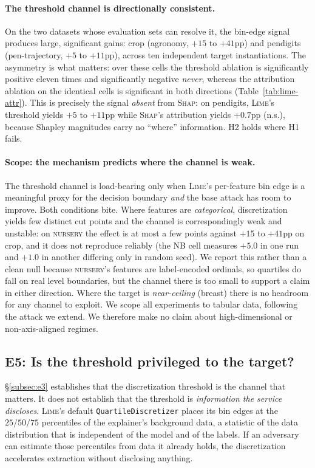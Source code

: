 \documentclass[sigconf,anonymous,review]{acmart}
\begin{document}
\paragraph{The threshold channel is directionally consistent.} On the two datasets whose evaluation
sets can resolve it, the bin-edge signal produces large, significant gains: crop (agronomy, $+15$ to
$+41$pp) and pendigits (pen-trajectory, $+5$ to $+11$pp), across ten independent target
instantiations. The asymmetry is what matters: over these cells the threshold ablation is
significantly positive eleven times and significantly negative \emph{never}, whereas the attribution
ablation on the identical cells is significant in both directions
(Table~\ref{tab:lime-attr}). This is precisely the signal \emph{absent} from \textsc{Shap}: on
pendigits, \textsc{Lime}'s threshold yields $+5$ to $+11$pp while \textsc{Shap}'s attribution yields
$+0.7$pp (n.s.), because Shapley magnitudes carry no ``where'' information. H2 holds where H1 fails.

\paragraph{Scope: the mechanism predicts where the channel is weak.} The threshold channel is
load-bearing only when \textsc{Lime}'s per-feature bin edge is a meaningful proxy for the decision
boundary \emph{and} the base attack has room to improve. Both conditions bite. Where features are
\emph{categorical}, discretization yields few distinct cut points and the channel is correspondingly
weak and unstable: on \textsc{nursery} the effect is at most a few points against $+15$ to $+41$pp on
crop, and it does not reproduce reliably (the NB cell measures $+5.0$ in one run and $+1.0$ in another differing only in random seed). We report this rather than a clean null because
\textsc{nursery}'s features are label-encoded ordinals, so quartiles do fall on real level boundaries, but the channel there is too small to support a claim in either direction. Where the target is \emph{near-ceiling} (breast) there is
no headroom for any channel to exploit. We scope all experiments to tabular data, following the attack we extend. We therefore make no claim about high-dimensional or non-axis-aligned regimes.

\subsection{E5: Is the threshold privileged to the target?}
\label{subsec:e5}
\S\ref{subsec:e3} establishes that the discretization threshold is the channel that matters. It does
not establish that the threshold is \emph{information the service discloses}. \textsc{Lime}'s default
\texttt{QuartileDiscretizer} places its bin edges at the $25/50/75$ percentiles of the explainer's background data, a statistic of the data distribution that is independent of the model and of the
labels. If an adversary can estimate those percentiles from data it already holds, the discretization
accelerates extraction without disclosing anything.
\end{document}
